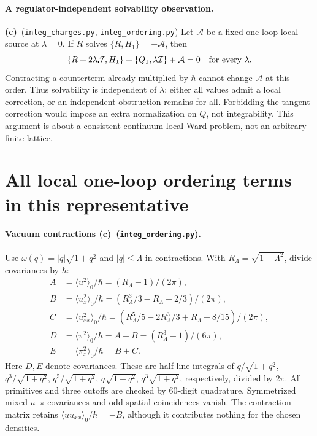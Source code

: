 \documentclass[11pt,a4paper]{article}
\newcommand{\C}{\textbf{(c)}\ }
\newcommand{\file}[1]{\nolinkurl{#1}}
\newcommand{\chg}{\file{integ_charges.py}}
\newcommand{\ord}{\file{integ_ordering.py}}
\newcommand{\I}{\mathcal I}
\newcommand{\J}{\mathcal J}
\begin{document}
\paragraph{A regulator-independent solvability observation.}
\C (\chg, \ord) Let $\mathcal A$ be a fixed one-loop local source at
$\lambda=0$. If $R$ solves $\{R,H_1\}=-\mathcal A$, then
\begin{equation}
 \{R+2\lambda\J,H_1\}+\{Q_1,\lambda\I\}+\mathcal A=0
 \quad\hbox{for every }\lambda.\label{affine}
\end{equation}
Contracting a counterterm already multiplied by $\hbar$ cannot change
$\mathcal A$ at this order. Thus solvability is independent of $\lambda$:
either all values admit a local correction, or an independent obstruction
remains for all. Forbidding the tangent correction would impose an extra
normalization on $Q$, not integrability. This argument is about a
consistent continuum local Ward problem, not an arbitrary finite lattice.

\section{All local one-loop ordering terms in this representative}
\paragraph{Vacuum contractions \C (\ord).}
Use $\omega(q)=|q|\sqrt{1+q^2}$ and $|q|\leq\Lambda$ in contractions.
With $R_\Lambda=\sqrt{1+\Lambda^2}$, divide covariances by $\hbar$:
\begin{align}
 A&=\langle u^2\rangle_0/\hbar=(R_\Lambda-1)/(2\pi),\\
 B&=\langle u_x^2\rangle_0/\hbar
 =(R_\Lambda^3/3-R_\Lambda+2/3)/(2\pi),\\
 C&=\langle u_{xx}^2\rangle_0/\hbar
 =(R_\Lambda^5/5-2R_\Lambda^3/3+R_\Lambda-8/15)/(2\pi),\\
 D&=\langle\pi^2\rangle_0/\hbar=A+B=(R_\Lambda^3-1)/(6\pi),\\
 E&=\langle\pi_x^2\rangle_0/\hbar=B+C.\label{cov}
\end{align}
Here $D,E$ denote covariances. These are half-line integrals of
$q/\sqrt{1+q^2}$, $q^3/\sqrt{1+q^2}$, $q^5/\sqrt{1+q^2}$,
$q\sqrt{1+q^2}$, $q^3\sqrt{1+q^2}$, respectively, divided by $2\pi$.
All primitives and three cutoffs are checked by 60-digit quadrature.
Symmetrized mixed $u$--$\pi$ covariances and odd spatial coincidences
vanish. The contraction matrix retains
$\langle uu_{xx}\rangle_0/\hbar=-B$, although it contributes nothing
for the chosen densities.
\end{document}
